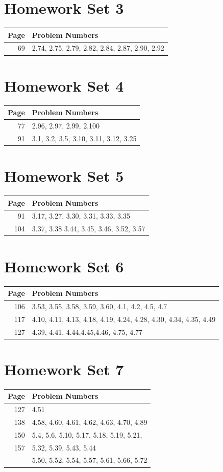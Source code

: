 \documentclass{book}
\begin{document}
\section{Homework Set 3}
\begin{tabular}{r|l}
Page & Problem Numbers\\
\hline
69 & 2.74, 2.75, 2.79, 2.82, 2.84, 2.87, 2.90, 2.92\\
\end{tabular}

\section{Homework Set 4}
\begin{tabular}{r|l}
Page & Problem Numbers\\
\hline
77 & 2.96, 2.97, 2.99, 2.100\\
91 & 3.1, 3.2, 3.5, 3.10, 3.11, 3.12, 3.25\\
\end{tabular}

\section{Homework Set 5}
\begin{tabular}{r|l}
Page & Problem Numbers\\
\hline
91 & 3.17, 3.27, 3.30, 3.31, 3.33, 3.35\\
104 & 3.37, 3.38 3.44, 3.45, 3.46, 3.52, 3.57\\
\end{tabular}

\section{Homework Set 6}
\begin{tabular}{r|l}
Page & Problem Numbers\\
\hline
106 & 3.53, 3.55, 3.58, 3.59, 3.60, 4.1, 4.2, 4.5, 4.7\\
117 & 4.10, 4.11, 4.13, 4.18, 4.19, 4.24, 4.28, 4.30, 4.34, 4.35, 4.49\\
127 & 4.39, 4.41, 4.44,4.45,4.46, 4.75, 4.77\\
\end{tabular}

\section{Homework Set 7}
\begin{tabular}{r|l}
Page & Problem Numbers\\
\hline
127 & 4.51\\
138 & 4.58, 4.60, 4.61, 4.62, 4.63, 4.70, 4.89\\
150 & 5.4, 5.6, 5.10, 5.17, 5.18, 5.19, 5.21,\\
157 & 5.32, 5.39, 5.43, 5.44\\
& 5.50, 5.52, 5.54, 5.57, 5.61, 5.66, 5.72\\
\end{tabular}


\newpage
\nocite{textbook}
\printbibliography
\end{document}
